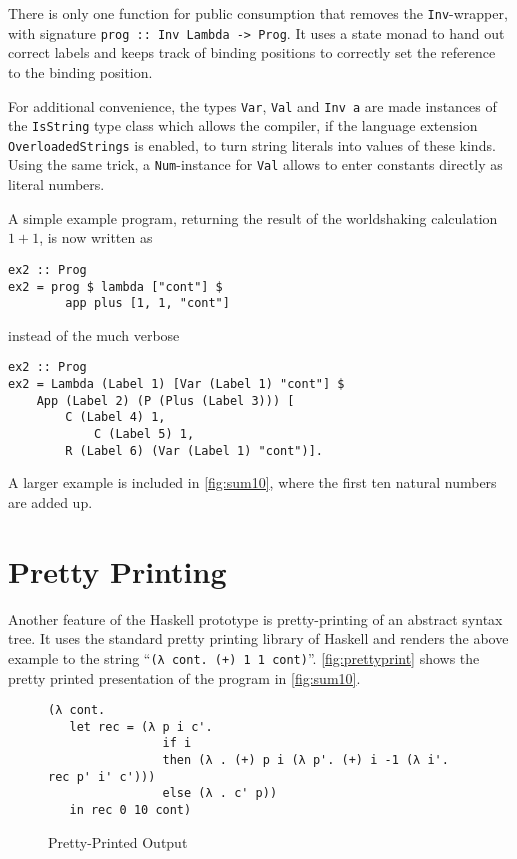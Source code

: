 \documentclass[a4paper,halfparskip,DIV=10,11pt]{scrbook}
\begin{document}
There is only one function for public consumption that removes the \lstinline-Inv--wrapper, with signature \lstinline!prog :: Inv Lambda -> Prog!. It uses a state monad to hand out correct labels and keeps track of binding positions to correctly set the reference to the binding position. 

For additional convenience, the types \lstinline!Var!, \lstinline!Val! and \lstinline!Inv a! are made instances of the \lstinline!IsString! type class which allows the compiler, if the language extension \lstinline!OverloadedStrings! is enabled, to turn string literals into values of these kinds. Using the same trick, a \lstinline!Num!-instance for \lstinline!Val! allows to enter constants directly as literal numbers.

A simple example program, returning the result of the worldshaking calculation $1 + 1$, is now written as
\begin{lstlisting}
ex2 :: Prog
ex2 = prog $ lambda ["cont"] $ 
        app plus [1, 1, "cont"]
\end{lstlisting}
instead of the much verbose
\begin{lstlisting}
ex2 :: Prog
ex2 = Lambda (Label 1) [Var (Label 1) "cont"] $
	App (Label 2) (P (Plus (Label 3))) [
		C (Label 4) 1,
	        C (Label 5) 1,
		R (Label 6) (Var (Label 1) "cont")].
\end{lstlisting}
A larger example is included in \vref{fig:sum10}, where the first ten natural numbers are added up.

\section{Pretty Printing}

Another feature of the Haskell prototype is pretty-printing of an abstract syntax tree. It uses the standard pretty printing library of Haskell \cite{pretty} and renders the above example to the string “\texttt{(λ\ cont.\ (+)\ 1\ 1\ cont)}”. \vref{fig:prettyprint} shows the pretty printed presentation of the program in \vref{fig:sum10}.

\begin{figure}
\centering
\begin{framed}
\begin{verbatim}
(λ cont.
   let rec = (λ p i c'.
                if i
                then (λ . (+) p i (λ p'. (+) i -1 (λ i'. rec p' i' c')))
                else (λ . c' p))
   in rec 0 10 cont)
\end{verbatim}
\end{framed}
\caption{Pretty-Printed Output}
\label{fig:prettyprint}
\end{figure}
\end{document}
